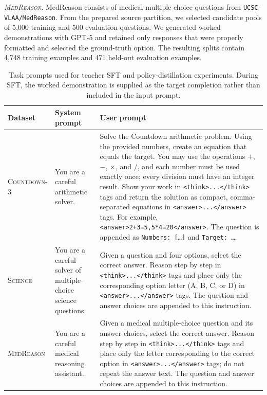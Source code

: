 \documentclass{article} %
\theoremstyle{plain}
\theoremstyle{definition}
\theoremstyle{remark}
\begin{document}
\textit{\textsc{MedReason}.}
MedReason consists of medical multiple-choice questions from \texttt{UCSC-VLAA/MedReason}. From the prepared source partition, we selected candidate pools of 5,000 training and 500 evaluation questions. We generated worked demonstrations with GPT-5 and retained only responses that were properly formatted and selected the ground-truth option. The resulting splits contain 4,748 training examples and 471 held-out evaluation examples.


\begin{table}[h]
\centering
\small
\setlength{\tabcolsep}{5pt}
\renewcommand{\arraystretch}{1.15}
\begin{tabular}{p{}p{}p{}}
\toprule
Dataset & System prompt & User prompt \\
\midrule
\textsc{Countdown-3}
&
You are a careful arithmetic solver.
&
Solve the Countdown arithmetic problem. Using the provided numbers, create an equation that equals the target. You may use the operations $+$, $-$, $\times$, and $/$, and each number must be used exactly once; every division must have an integer result. Show your work in \texttt{<think>...</think>} tags and return the solution as compact, comma-separated equations in \texttt{<answer>...</answer>} tags. For example, \texttt{<answer>2+3=5,5*4=20</answer>}. The question is appended as \texttt{Numbers: [\ldots]} and \texttt{Target: \ldots}.
\\
\addlinespace
\textsc{Science}
&
You are a careful solver of multiple-choice science questions.
&
Given a question and four options, select the correct answer. Reason step by step in \texttt{<think>...</think>} tags and place only the corresponding option letter (A, B, C, or D) in \texttt{<answer>...</answer>} tags. The question and answer choices are appended to this instruction.
\\
\addlinespace
\textsc{MedReason}
&
You are a careful medical reasoning assistant.
&
Given a medical multiple-choice question and its answer choices, select the correct answer. Reason step by step in \texttt{<think>...</think>} tags and place only the letter corresponding to the correct option in \texttt{<answer>...</answer>} tags; do not repeat the answer text. The question and answer choices are appended to this instruction.
\\
\bottomrule
\end{tabular}
\caption{Task prompts used for teacher SFT and policy-distillation experiments. During SFT, the worked demonstration is supplied as the target completion rather than included in the input prompt.}
\label{tab:dataset-prompts}
\end{table}
\end{document}
